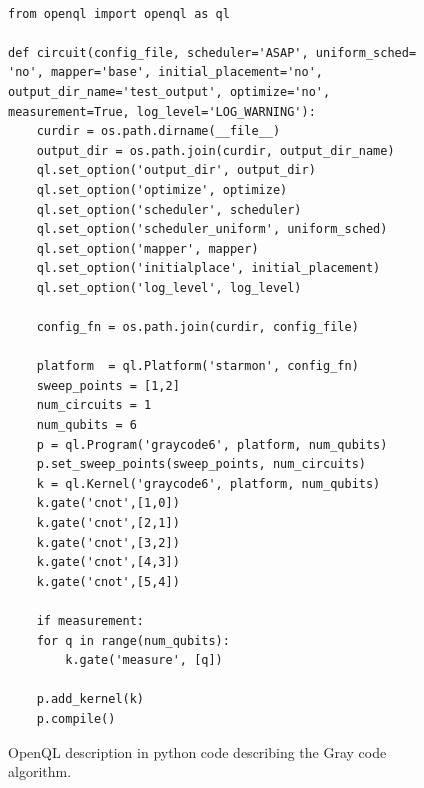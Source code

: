 \begin{figure}
\centering
\begin{minipage}{\textwidth}

\begin{verbatim}

from openql import openql as ql

def circuit(config_file, scheduler='ASAP', uniform_sched= 'no', mapper='base', initial_placement='no', output_dir_name='test_output', optimize='no', measurement=True, log_level='LOG_WARNING'):
    curdir = os.path.dirname(__file__)
    output_dir = os.path.join(curdir, output_dir_name)
    ql.set_option('output_dir', output_dir)
    ql.set_option('optimize', optimize)
    ql.set_option('scheduler', scheduler)
    ql.set_option('scheduler_uniform', uniform_sched)
    ql.set_option('mapper', mapper)
    ql.set_option('initialplace', initial_placement)
    ql.set_option('log_level', log_level)

    config_fn = os.path.join(curdir, config_file)

    platform  = ql.Platform('starmon', config_fn)
    sweep_points = [1,2]
    num_circuits = 1
    num_qubits = 6
    p = ql.Program('graycode6', platform, num_qubits)
    p.set_sweep_points(sweep_points, num_circuits)
    k = ql.Kernel('graycode6', platform, num_qubits)
    k.gate('cnot',[1,0])
    k.gate('cnot',[2,1])
    k.gate('cnot',[3,2])
    k.gate('cnot',[4,3])
    k.gate('cnot',[5,4])

    if measurement:
	for q in range(num_qubits):
	    k.gate('measure', [q])

    p.add_kernel(k)
    p.compile()

\end{verbatim}

\caption{OpenQL description in python code describing the Gray code algorithm.}
\label{code:openql_gray_code}
\end{minipage}
\end{figure}


